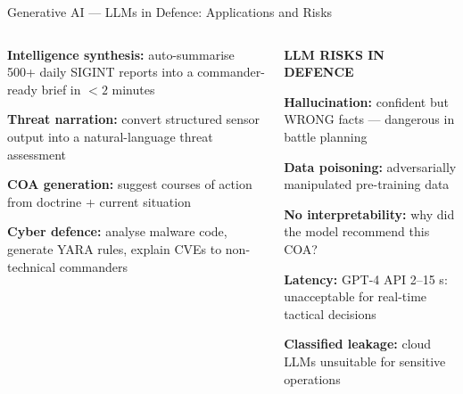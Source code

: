 \documentclass[aspectratio=169,10pt,t]{beamer}
\begin{document}
\begin{frame}{Generative AI --- LLMs in Defence: Applications and Risks}
\begin{columns}[T]
\begin{tl}\item \textbf{Intelligence synthesis:} auto-summarise 500+ daily SIGINT reports into a commander-ready brief in $<2$ minutes
\item \textbf{Threat narration:} convert structured sensor output into a natural-language threat assessment
\item \textbf{COA generation:} suggest courses of action from doctrine + current situation
\item \textbf{Cyber defence:} analyse malware code, generate YARA rules, explain CVEs to non-technical commanders\end{tl}
\begin{wbox}\scriptsize\textbf{LLM RISKS IN DEFENCE}\begin{tl}\item \textbf{Hallucination:} confident but WRONG facts --- dangerous in battle planning
\item \textbf{Data poisoning:} adversarially manipulated pre-training data
\item \textbf{No interpretability:} why did the model recommend this COA?
\item \textbf{Latency:} GPT-4 API 2--15 s: unacceptable for real-time tactical decisions
\item \textbf{Classified leakage:} cloud LLMs unsuitable for sensitive operations\end{tl}\end{wbox}
\end{columns}
\end{frame}
\end{document}
